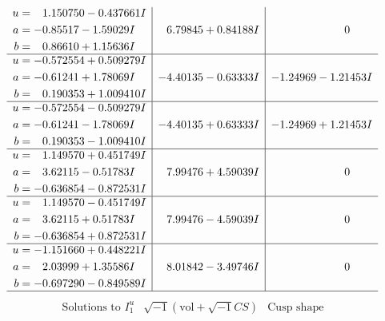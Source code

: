\documentclass[1p]{elsarticle_modified}
\theoremstyle{definition}
\newcommand{\I}{\sqrt{-1}}
\begin{document}
$$\begin{array}{c|c|c}
\begin{aligned}
u &= \phantom{-}1.150750 - 0.437661 I \\
a &= -0.85517 - 1.59029 I \\
b &= \phantom{-}0.86610 + 1.15636 I\end{aligned}
 & \phantom{-}6.79845 + 0.84188 I & \phantom{-0.000000 } 0 \\ \hline\begin{aligned}
u &= -0.572554 + 0.509279 I \\
a &= -0.61241 + 1.78069 I \\
b &= \phantom{-}0.190353 + 1.009410 I\end{aligned}
 & -4.40135 - 0.63333 I & -1.24969 - 1.21453 I \\ \hline\begin{aligned}
u &= -0.572554 - 0.509279 I \\
a &= -0.61241 - 1.78069 I \\
b &= \phantom{-}0.190353 - 1.009410 I\end{aligned}
 & -4.40135 + 0.63333 I & -1.24969 + 1.21453 I \\ \hline\begin{aligned}
u &= \phantom{-}1.149570 + 0.451749 I \\
a &= \phantom{-}3.62115 - 0.51783 I \\
b &= -0.636854 - 0.872531 I\end{aligned}
 & \phantom{-}7.99476 + 4.59039 I & \phantom{-0.000000 } 0 \\ \hline\begin{aligned}
u &= \phantom{-}1.149570 - 0.451749 I \\
a &= \phantom{-}3.62115 + 0.51783 I \\
b &= -0.636854 + 0.872531 I\end{aligned}
 & \phantom{-}7.99476 - 4.59039 I & \phantom{-0.000000 } 0 \\ \hline\begin{aligned}
u &= -1.151660 + 0.448221 I \\
a &= \phantom{-}2.03999 + 1.35586 I \\
b &= -0.697290 - 0.849589 I\end{aligned}
 & \phantom{-}8.01842 - 3.49746 I & \phantom{-0.000000 } 0\\
 \hline 
 \end{array}$$\newpage$$\begin{array}{c|c|c}  
\text{Solutions to }I^u_{1}& \I (\text{vol} + \sqrt{-1}CS) & \text{Cusp shape}\\
 \hline 
\begin{aligned}

\end{aligned}
\end{array}$$
\end{document}
